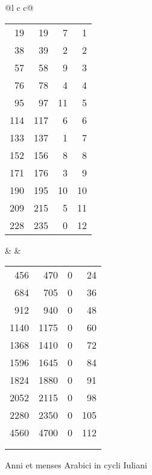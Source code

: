\begin{tabnums}
\begin{tabular}{@{}l c c@{}}
\begin{tabular}{@{}r r r r}
\hdrs
\\
\midrule
   19 &   19 &  7 &   1 \\
   38 &   39 &  2 &   2 \\
   57 &   58 &  9 &   3 \\
   76 &   78 &  4 &   4 \\
   95 &   97 & 11 &   5 \\
  114 &  117 &  6 &   6 \\
  133 &  137 &  1 &   7 \\
  152 &  156 &  8 &   8 \\
  171 &  176 &  3 &   9 \\
  190 &  195 & 10 &  10 \\
  209 &  215 &  5 &  11 \\
  228 &  235 &  0 &  12 \\
\bottomrule
\end{tabular}
& \hspace*{3ex} &
\begin{tabular}{@{}r r r r}
\hdrs
\\
\midrule
  456 &  470 &  0 &  24 \\
  684 &  705 &  0 &  36 \\
  912 &  940 &  0 &  48 \\
 1140 & 1175 &  0 &  60 \\
 1368 & 1410 &  0 &  72 \\
 1596 & 1645 &  0 &  84 \\
 1824 & 1880 &  0 &  91 \\
 2052 & 2115 &  0 &  98 \\
 2280 & 2350 &  0 & 105 \\
 4560 & 4700 &  0 & 112 \\
\bottomrule
 \\
 \\
\end{tabular}
\end{tabular}
%
\caption{Anni et menses Arabici in cycli Iuliani}
\label{tab:p121}
\end{tabnums}

